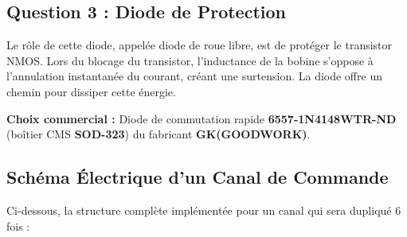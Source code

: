 \documentclass[11pt,a4paper]{article}
\begin{document}
\subsection{Question 3 : Diode de Protection}
Le rôle de cette diode, appelée diode de roue libre, est de protéger le transistor NMOS. Lors du blocage du transistor, l'inductance de la bobine s'oppose à l'annulation instantanée du courant, créant une surtension. La diode offre un chemin pour dissiper cette énergie.

\textbf{Choix commercial :} Diode de commutation rapide \textbf{6557-1N4148WTR-ND} \cite{goodwork_diode} (boîtier CMS \textbf{SOD-323}) du fabricant \textbf{GK(GOODWORK)}.

\begin{table}[htpb]
    \centering
    \renewcommand{\arraystretch}{1.3} 
    \caption{Justification du choix de la diode de roue libre}
    \label{tab:choix_diode}
\end{table}
\newpage
\subsection{Schéma Électrique d'un Canal de Commande}
Ci-dessous, la structure complète implémentée pour un canal qui sera dupliqué 6 fois :
\end{document}
